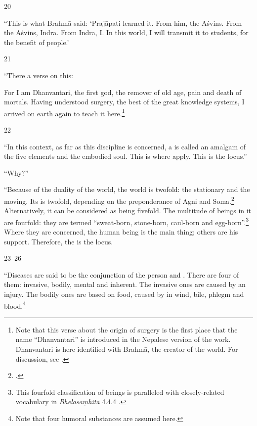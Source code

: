 \begin{translation}
    \item[20] 
    
“This is what Brahmā said: `Prajāpati learned it. From him, the
Aśvins. From the Aśvins, Indra. From Indra, I. In this world, I will
transmit it to students, for the benefit of people.'
    
  \item[21]   
  
“There a verse on this:   
    \begin{sloka}
        For I am Dhanvantari, the first god, the remover of old age,
pain and death of mortals. Having understood surgery, the
best of the great knowledge systems, I arrived on earth again
to teach it here.\footnote{Note that this verse about the
    origin of surgery is the first place that the name
    “Dhanvantari” is introduced in the Nepalese version of the
    work. Dhanvantari is here identified with Brahmā, the creator
    of the world. For discussion, see \cite{birc-2021}.}
    \end{sloka}    
    
    
    \item[22] 
    
“In this context, as far as this discipline is concerned, a
 is called an amalgam of the five elements
and the embodied soul.  This is where  apply.
This is the locus.”
    
“Why?”
    
“Because of the duality of the world, the world is twofold: the
stationary and the moving. Its  is twofold,
depending on the preponderance of Agni and
Soma.\footcite[See][]{wuja-2004}  Alternatively, it can be considered
as being fivefold.  The multitude of beings in it are fourfold: they
are termed “sweat-born, stone-born, caul-born and
egg-born”.\footnote{This fourfold classification of beings is
    paralleled with closely-related vocabulary in  \emph{Bhelasaṃhitā}
    4.4.4 \parencites[206]{kris-2000}[81]{mook-1921}.}  Where they are
    concerned, the human being is the main thing; others are his support.
    Therefore, the  is the locus.
    
    \item[23--26]  

“Diseases are said to be the conjunction of the person and
. There are four of them: invasive, bodily,
mental and inherent.  The invasive ones are caused by an injury.  The
bodily ones are based on food, caused by
 in wind, bile, phlegm and
blood.\footnote{Note that four humoral substances are assumed here.}
    

\end{translation}
